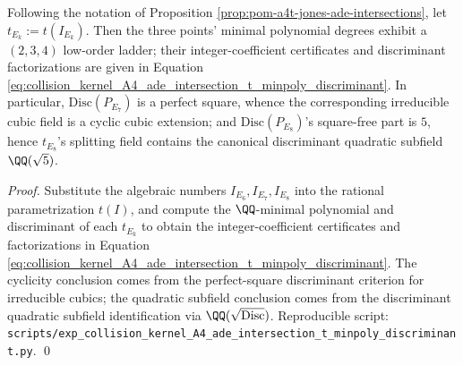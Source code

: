 \begin{proposition}\label{prop:pom-a4t-ade-intersection-t-minpoly-discriminant}
Following the notation of Proposition \ref{prop:pom-a4t-jones-ade-intersections}, let \(t_{E_k}:=t(I_{E_k})\).
Then the three points' minimal polynomial degrees exhibit a \((2,3,4)\) low-order ladder; their integer-coefficient certificates and discriminant factorizations are given in Equation \eqref{eq:collision_kernel_A4_ade_intersection_t_minpoly_discriminant}.
In particular, \(\mathrm{Disc}(P_{E_7})\) is a perfect square, whence the corresponding irreducible cubic field is a cyclic cubic extension;
and \(\mathrm{Disc}(P_{E_8})\)'s square-free part is \(5\), hence \(t_{E_8}\)'s splitting field contains the canonical discriminant quadratic subfield \(\QQ(\sqrt5)\).
\end{proposition}
\begin{proof}
Substitute the algebraic numbers \(I_{E_6},I_{E_7},I_{E_8}\) into the rational parametrization \(t(I)\), and compute the \(\QQ\)-minimal polynomial and discriminant of each \(t_{E_k}\) to obtain the integer-coefficient certificates and factorizations in Equation \eqref{eq:collision_kernel_A4_ade_intersection_t_minpoly_discriminant}.
The cyclicity conclusion comes from the perfect-square discriminant criterion for irreducible cubics; the quadratic subfield conclusion comes from the discriminant quadratic subfield identification via \(\QQ(\sqrt{\mathrm{Disc}})\).
Reproducible script: \texttt{scripts/exp\_collision\_kernel\_A4\_ade\_intersection\_t\_minpoly\_discriminant.py}. \qed
\end{proof}







